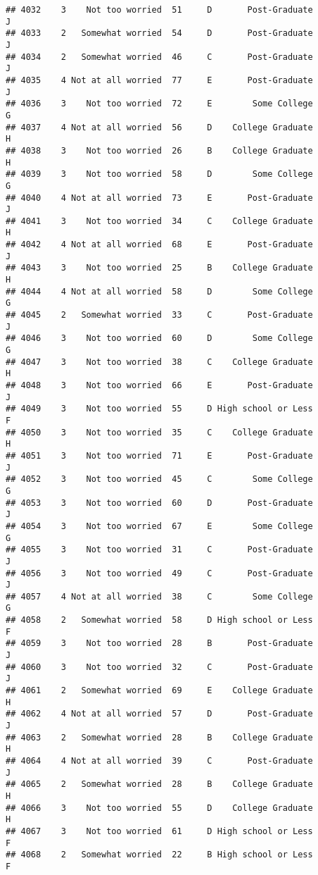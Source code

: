 \documentclass[
]{article}
\begin{document}
\begin{verbatim}
## 4032    3    Not too worried  51     D       Post-Graduate         J
## 4033    2   Somewhat worried  54     D       Post-Graduate         J
## 4034    2   Somewhat worried  46     C       Post-Graduate         J
## 4035    4 Not at all worried  77     E       Post-Graduate         J
## 4036    3    Not too worried  72     E        Some College         G
## 4037    4 Not at all worried  56     D    College Graduate         H
## 4038    3    Not too worried  26     B    College Graduate         H
## 4039    3    Not too worried  58     D        Some College         G
## 4040    4 Not at all worried  73     E       Post-Graduate         J
## 4041    3    Not too worried  34     C    College Graduate         H
## 4042    4 Not at all worried  68     E       Post-Graduate         J
## 4043    3    Not too worried  25     B    College Graduate         H
## 4044    4 Not at all worried  58     D        Some College         G
## 4045    2   Somewhat worried  33     C       Post-Graduate         J
## 4046    3    Not too worried  60     D        Some College         G
## 4047    3    Not too worried  38     C    College Graduate         H
## 4048    3    Not too worried  66     E       Post-Graduate         J
## 4049    3    Not too worried  55     D High school or Less         F
## 4050    3    Not too worried  35     C    College Graduate         H
## 4051    3    Not too worried  71     E       Post-Graduate         J
## 4052    3    Not too worried  45     C        Some College         G
## 4053    3    Not too worried  60     D       Post-Graduate         J
## 4054    3    Not too worried  67     E        Some College         G
## 4055    3    Not too worried  31     C       Post-Graduate         J
## 4056    3    Not too worried  49     C       Post-Graduate         J
## 4057    4 Not at all worried  38     C        Some College         G
## 4058    2   Somewhat worried  58     D High school or Less         F
## 4059    3    Not too worried  28     B       Post-Graduate         J
## 4060    3    Not too worried  32     C       Post-Graduate         J
## 4061    2   Somewhat worried  69     E    College Graduate         H
## 4062    4 Not at all worried  57     D       Post-Graduate         J
## 4063    2   Somewhat worried  28     B    College Graduate         H
## 4064    4 Not at all worried  39     C       Post-Graduate         J
## 4065    2   Somewhat worried  28     B    College Graduate         H
## 4066    3    Not too worried  55     D    College Graduate         H
## 4067    3    Not too worried  61     D High school or Less         F
## 4068    2   Somewhat worried  22     B High school or Less         F

\end{verbatim}
\end{document}
